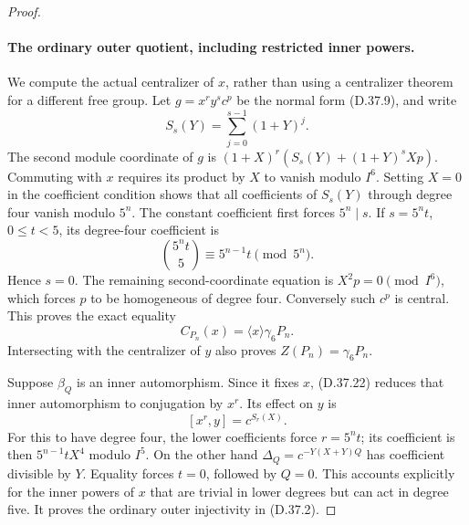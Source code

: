 \begin{proof}
\paragraph{The ordinary outer quotient, including restricted inner powers.}
We compute the actual centralizer of \(x\), rather
than using a centralizer theorem for a different
free group.  Let
\(g=x^r y^s c^p\) be the normal form
\textup{(D.37.9)}, and write
\[
                   S_s(Y)=\sum_{j=0}^{s-1}(1+Y)^j.
 \tag{D.37.20}
\]
The second module coordinate of \(g\) is
\((1+X)^r(S_s(Y)+(1+Y)^sXp)\).
Commuting with \(x\) requires its product by
\(X\) to vanish modulo \(I^6\).
Setting \(X=0\) in the coefficient condition
shows that all coefficients of \(S_s(Y)\)
through degree four vanish modulo \(5^n\).
The constant coefficient first forces
\(5^n\mid s\).  If \(s=5^n t\), \(0\leq t<5\),
its degree-four coefficient is
\[
                    \binom{5^n t}{5}
                       \equiv5^{n-1}t\pmod{5^n}.
 \tag{D.37.21}
\]
Hence \(s=0\).
The remaining second-coordinate equation is
\(X^2p=0\pmod{I^6}\), which forces \(p\)
to be homogeneous of degree four.
Conversely such \(c^p\) is central.
This proves the exact equality
\[
                        C_{P_n}(x)=
                        \langle x\rangle\gamma_6P_n.
 \tag{D.37.22}
\]
Intersecting with the centralizer of \(y\)
also proves \(Z(P_n)=\gamma_6P_n\).

Suppose \(\beta_Q\) is an inner automorphism.
Since it fixes \(x\), \textup{(D.37.22)}
reduces that inner automorphism to conjugation
by \(x^r\).  Its effect on \(y\) is
\[
                         [x^r,y]=c^{S_r(X)}.
 \tag{D.37.23}
\]
For this to have degree four, the lower
coefficients force \(r=5^n t\); its coefficient
is then \(5^{n-1}tX^4\) modulo \(I^5\).
On the other hand
\(\Delta_Q=c^{-Y(X+Y)Q}\) has coefficient
divisible by \(Y\).
Equality forces \(t=0\), followed by \(Q=0\).
This accounts explicitly for the inner powers
of \(x\) that are trivial in lower degrees
but can act in degree five.
It proves the ordinary outer injectivity
in \textup{(D.37.2)}.


\end{proof}
